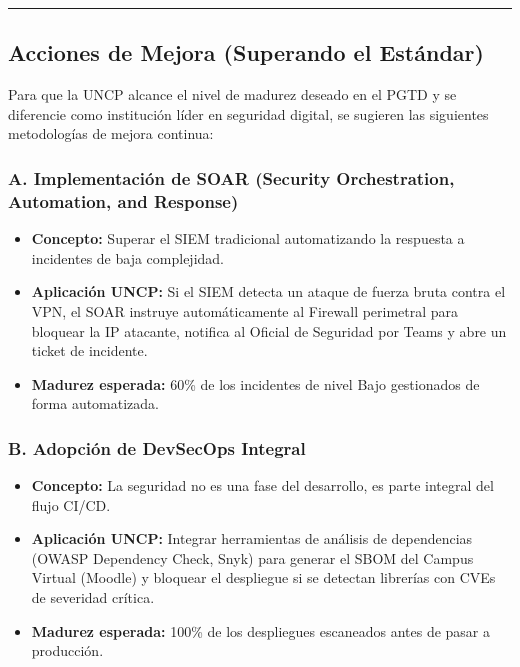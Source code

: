 \documentclass[10pt,letterpaper]{article}
\begin{document}
\begin{center}\rule{0.5\linewidth}{0.5pt}\end{center}

\subsection{Acciones de Mejora (Superando el
Estándar)}\label{acciones-de-mejora-superando-el-estuxe1ndar}

Para que la UNCP alcance el nivel de madurez deseado en el PGTD y se
diferencie como institución líder en seguridad digital, se sugieren las
siguientes metodologías de mejora continua:

\subsubsection{A. Implementación de SOAR (Security Orchestration,
Automation, and
Response)}\label{a.-implementaciuxf3n-de-soar-security-orchestration-automation-and-response}

\begin{itemize}
\tightlist
\item
  \textbf{Concepto:} Superar el SIEM tradicional automatizando la
  respuesta a incidentes de baja complejidad.
\item
  \textbf{Aplicación UNCP:} Si el SIEM detecta un ataque de fuerza bruta
  contra el VPN, el SOAR instruye automáticamente al Firewall perimetral
  para bloquear la IP atacante, notifica al Oficial de Seguridad por
  Teams y abre un ticket de incidente.
\item
  \textbf{Madurez esperada:} 60\% de los incidentes de nivel Bajo
  gestionados de forma automatizada.
\end{itemize}

\subsubsection{B. Adopción de DevSecOps
Integral}\label{b.-adopciuxf3n-de-devsecops-integral}

\begin{itemize}
\tightlist
\item
  \textbf{Concepto:} La seguridad no es una fase del desarrollo, es
  parte integral del flujo CI/CD.
\item
  \textbf{Aplicación UNCP:} Integrar herramientas de análisis de
  dependencias (OWASP Dependency Check, Snyk) para generar el SBOM del
  Campus Virtual (Moodle) y bloquear el despliegue si se detectan
  librerías con CVEs de severidad crítica.
\item
  \textbf{Madurez esperada:} 100\% de los despliegues escaneados antes
  de pasar a producción.
\end{itemize}
\end{document}
